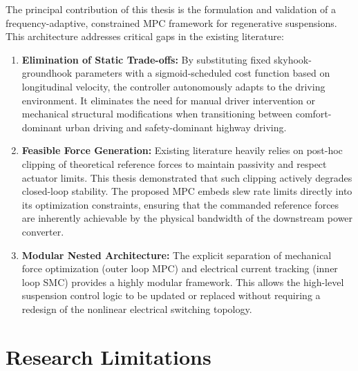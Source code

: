 The principal contribution of this thesis is the formulation and validation of a frequency-adaptive, constrained MPC framework for regenerative suspensions. This architecture addresses critical gaps in the existing literature:
\begin{enumerate}
    \item \textbf{Elimination of Static Trade-offs:} By substituting fixed skyhook-groundhook parameters with a sigmoid-scheduled cost function based on longitudinal velocity, the controller autonomously adapts to the driving environment. It eliminates the need for manual driver intervention or mechanical structural modifications when transitioning between comfort-dominant urban driving and safety-dominant highway driving.
    \item \textbf{Feasible Force Generation:} Existing literature heavily relies on post-hoc clipping of theoretical reference forces to maintain passivity and respect actuator limits. This thesis demonstrated that such clipping actively degrades closed-loop stability. The proposed MPC embeds slew rate limits directly into its optimization constraints, ensuring that the commanded reference forces are inherently achievable by the physical bandwidth of the downstream power converter.
    \item \textbf{Modular Nested Architecture:} The explicit separation of mechanical force optimization (outer loop MPC) and electrical current tracking (inner loop SMC) provides a highly modular framework. This allows the high-level suspension control logic to be updated or replaced without requiring a redesign of the nonlinear electrical switching topology.
\end{enumerate}

\section{Research Limitations}
\label{sec:conclusion_limitations}

